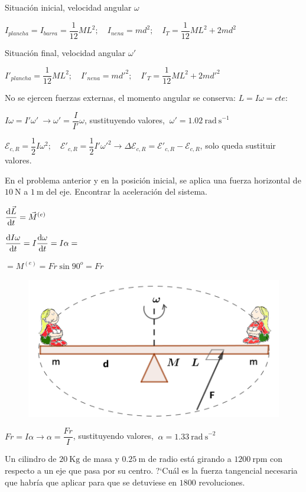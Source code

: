 Situación inicial, velocidad angular $\omega$

$I_{plancha}=I_{barra}=\dfrac 1{12} ML^2; \quad I_{nena}=md^2;\quad I_T=\dfrac 1{12} ML^2+2md^2$

Situación final, velocidad angular $\omega'$

$I'_{plancha}=\dfrac 1{12} ML^2; \quad I'_{nena}=md'^2;\quad I'_T=\dfrac 1{12} ML^2+2md'^2$

No se ejercen fuerzas externas, el momento angular se conserva: $L=I\omega=cte$:

$I\omega=I'\omega' \ \to \omega'=\dfrac I{I'}\omega$, sustituyendo valores, $\ \omega' =1.02  \ \mathrm{rad\ s}^{-1}$

$\mathcal{E}_{c,R}=\dfrac 1 2 I \omega^2; \quad \mathcal{E'}_{c,R}=\dfrac 1 2 I' \omega'^2 \to \Delta \mathcal{E}_{c,R}= \mathcal{E'}_{c,R}- \mathcal{E}_{c,R}$, solo queda sustituir valores.

\begin{prob}
	En el problema anterior y en la posición inicial, se aplica una fuerza horizontal de $10\ \mathrm{N}$ a $1\ \mathrm{m}$ del eje. Encontrar la aceleración del sistema.
\end{prob}

\begin{multicols}{2}
$\displaystyle \dv{\vec L}{t}=\vec M^{(e)}$

$\displaystyle \dv{I\omega}{t}=I\dv{\omega}{t}=I\alpha=$

$=M^{(e)}=Fr\sin 90^o=Fr$
\begin{figure}[H]
	\centering
	\includegraphics[width=.4\textwidth]{imagenes/imagenes16/T16IM20.png}
\end{figure}	
\end{multicols}

$Fr=I\alpha \to \alpha = \dfrac{Fr}{I}$, sustituyendo valores, $\ \alpha=1.33 \ \mathrm{rad\ s}^{-2}$

\begin{prob}
Un cilindro de $20 \ \mathrm{Kg}$ de masa y $0.25\ \mathrm{m}$ de radio está girando a $1200\ \mathrm{rpm}$ con respecto a un eje que pasa por su centro. ?`Cuál es la fuerza tangencial necesaria que habría que aplicar para que se detuviese en $1800$ revoluciones.
\end{prob}

